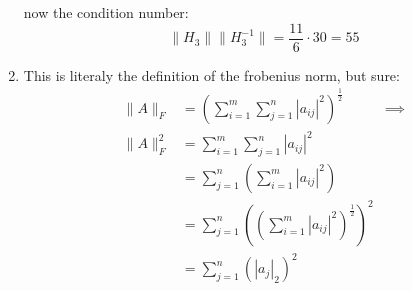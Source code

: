 \documentclass{article}
\begin{document}
\begin{enumerate}
{\begin{displaymath}
            \end{displaymath}
            now the condition number:
            \begin{displaymath}
                \|H_3\|\|H_3^{-1}\| = \frac{11}{6} \cdot 30 = 55
            \end{displaymath}
        }
        \item {
            This is literaly the definition of the frobenius norm, but sure:
            \begin{displaymath}
                \begin{aligned}
                    \|A\|_F 
                    &= \left(\sum_{i=1}^m\sum_{j=1}^n|a_{ij}|^2\right)^\frac{1}{2} &\implies \\
                    \|A\|_F^2
                    &= \sum_{i=1}^m\sum_{j=1}^n|a_{ij}|^2 \\
                    &= \sum_{j=1}^n\left(\sum_{i=1}^m|a_{ij}|^2\right) \\
                    &= \sum_{j=1}^n\left(\left(\sum_{i=1}^m|a_{ij}|^2\right)^\frac{1}{2}\right)^2 \\
                    &= \sum_{j=1}^n\left(|a_j|_2\right)^2
                \end{aligned}
            \end{displaymath}
        }
    \end{enumerate}
\end{document}
